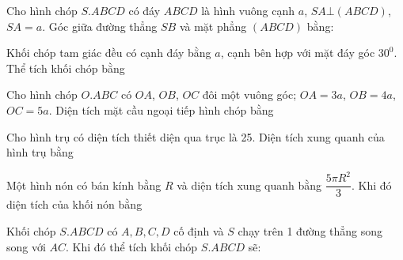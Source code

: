 \begin{question}%
Cho hình chóp $S.ABCD$ có đáy $ABCD$ là hình vuông cạnh $a$, $SA \bot (ABCD)$, $SA= a$. Góc giữa đường thẳng $SB$ và mặt phẳng $(ABCD)$ bằng:
\vspace{0.2cm}
\datcot
\bonpa
{}
{}
{}
{}
\end{question}

\begin{question}%
Khối chóp tam giác đều có cạnh đáy bằng $a$, cạnh bên hợp với mặt đáy góc $30^0$. Thể tích khối chóp bằng
\vspace{0.2cm}
\datcot
\bonpa
{}
{}
{}
{}
\end{question}

\begin{question}%
Cho hình chóp $O.ABC$ có $OA$, $OB$, $OC$ đôi một vuông góc; $OA=3a$, $OB=4a$, $OC=5a$. Diện tích mặt cầu ngoại tiếp hình chóp bằng
\vspace{0.2cm}
\datcot
\bonpa
{}
{}
{}
{}
\end{question}

\begin{question}%
Cho hình trụ có diện tích thiết diện qua trục là 25. Diện tích xung quanh của hình trụ bằng
\vspace{0.2cm}
\datcot
\bonpa
{}
{}
{}
{}
\end{question}

\begin{question}%
Một hình nón có bán kính bằng $R$ và diện tích xung quanh bằng $\dfrac{5\pi R^2}{3}$. Khi đó diện tích của khối nón bằng
\vspace{0.2cm}
\datcot
\bonpa
{}
{}
{}
{}
\end{question}

\begin{question}%
Khối chóp $S.ABCD$ có $A, B, C, D$ cố định và $S$ chạy trên 1 đường thẳng song song với $AC$. Khi đó thể tích khối chóp $S.ABCD$ sẽ:
\vspace{0.2cm}
\datcot
\bonpa
{}
{}
{}
{}
\end{question}

